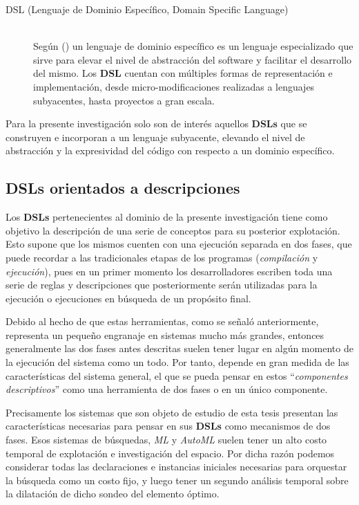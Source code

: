 \begin{description}

      \item[DSL (Lenguaje de Dominio Específico, Domain Specific Language)]  \hfill \\ 
      Según (\cite{langlois2007dsl}) un lenguaje de dominio específico es un lenguaje especializado que sirve
      para elevar el nivel de abstracción del software y facilitar el desarrollo del mismo.
      Los {\bf DSL} cuentan con múltiples formas de representación e implementación, desde
      micro-modificaciones realizadas a lenguajes subyacentes, hasta proyectos a gran escala.
      

\end{description}

Para la presente investigación solo son de interés aquellos {\bf DSLs} que se construyen e
incorporan a un lenguaje subyacente, elevando el nivel de abstracción y la expresividad
del código con respecto a un dominio específico.

\subsection{DSLs orientados a descripciones}

Los {\bf DSLs} pertenecientes al dominio de la presente investigación tiene como objetivo
la descripción de una serie de conceptos para su posterior explotación. Esto supone que
los mismos cuenten con una ejecución separada en dos fases, que puede recordar a las
tradicionales etapas de los programas ({\it compilación} y {\it ejecución}), pues en un
primer momento los desarrolladores escriben toda una serie de reglas y descripciones
que posteriormente serán utilizadas para la ejecución o ejecuciones en búsqueda de un
propósito final.

Debido al hecho de que estas herramientas, como se señaló anteriormente, representa un
pequeño engranaje en sistemas mucho más grandes, entonces generalmente las dos fases
antes descritas suelen tener lugar en algún momento de la ejecución del sistema como un
todo. Por tanto, depende en gran medida de las características del sistema general, el
que se pueda pensar en estos ``{\it componentes descriptivos}'' como una herramienta de dos
fases o en un único componente.

Precisamente los sistemas que son objeto de estudio de esta tesis presentan las
características necesarias para pensar en sus {\bf DSLs} como mecanismos de dos fases.
Esos sistemas de búsquedas, {\it ML} y {\it AutoML} suelen tener un alto costo temporal de
explotación e investigación del espacio. Por dicha razón podemos considerar todas las
declaraciones e instancias iniciales necesarias para orquestar la búsqueda como un
costo fijo, y luego tener un segundo análisis temporal sobre la dilatación de dicho
sondeo del elemento óptimo.

